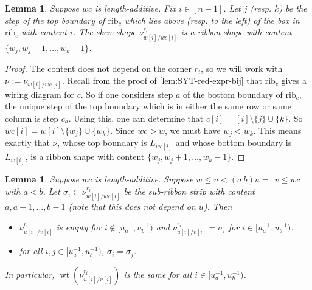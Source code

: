 \documentclass[11pt]{amsart}
\newtheorem{lemma}[Thm]{Lemma}
\theoremstyle{definition}
\DeclareMathOperator{\wt}{wt}
\def\rib_#1{\mathrm{rib}_{#1}}
\def\path{L}
\def\skew{\nu}
\begin{document}
\begin{lemma}\label{lem:w-wc-bound-ribbon}
	Suppose $wc$ is length-additive. Fix $i \in [n-1]$. Let $j$ (resp. $k$) be the step of the top boundary of $\rib_c$ which lies above (resp. to the left) of the box in $\rib_c$ with content $i$. The skew shape $\skew_{w[i]/wc[i]}^{r_i}$ is a ribbon shape with content $\{w_j, w_j +1 , \dots, w_k-1\}$.
\end{lemma}
\begin{proof}
	The content does not depend on the corner $r_i$, so we will work with $\skew_{}:=\skew_{w[i]/wc[i]}$. 
	Recall from the proof of \cref{lem:SYT-red-expr-bij} that $\rib_c$ gives a wiring diagram for $c$. So if one considers step $a$ of the bottom boundary of $\rib_c$, the unique step of the top boundary which is in either the same row or same column is step $c_a$. Using this, one can determine that $c[i]=[i] \setminus \{j\} \cup \{k\}$. So $wc[i]=w[i] \setminus \{w_j\} \cup \{w_k\}$. Since $wc>w$, we must have $w_j < w_k$. This means exactly that $\skew_{}$, whose top boundary is $\path_{wc[i]}$ and whose bottom boundary is $\path_{w[i]}$, is a ribbon shape with content $\{w_j, w_j +1, \dots, w_k-1\}$.  
\end{proof}


\begin{lemma}\label{prop:wt-constant}
	Suppose $wc$ is length-additive. Suppose $w \leq u <  (a~b) u=:v \leq wc$ with $a<b$. Let $\sigma_i \subset \skew_{w[i]/wc[i]}^{r_i}$ be the sub-ribbon strip with content $a, a+1, \dots, b-1$ (note that this does not depend on $u$). Then
	\begin{itemize}
			\item $\skew_{u[i]/v[i]}^{r_i}$ is empty for $ i \notin [u_a^{-1}, u_b^{-1})$ and $\skew_{u[i]/v[i]}^{r_i}=\sigma_i$ for $i \in [u_a^{-1}, u_b^{-1})$.
		\item for all $i, j \in [u_a^{-1}, u_b^{-1})$, $\sigma_i = \sigma_j$.
	\end{itemize}
	In particular, $\wt(\skew_{u[i]/v[i]}^{r_i})$ is the same for all $i \in [u_a^{-1}, u_b^{-1})$.
\end{lemma}
\end{document}

